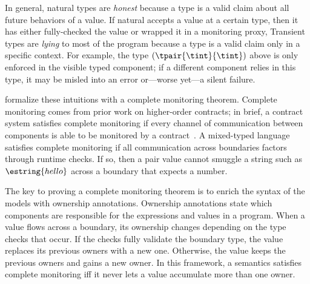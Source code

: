 In general, natural types are \emph{honest}\/ because a type is a valid
 claim about all future behaviors of a value.
If natural accepts a value at a certain type, then it has either fully-checked
 the value or wrapped it in a monitoring proxy,
Transient types are \emph{lying}\/ to most of the program because a type is
 a valid claim only in a specific context.
For example, the type $(\tpair{\tint}{\tint})$ above is only enforced in
 the visible typed component; if a different component relies in this type, it
 may be misled into an error or---worse yet---a silent failure.

\citet{gfd-oopsla-2019} formalize these intuitions with a complete
 monitoring theorem.
Complete monitoring comes from prior work on higher-order contracts;
 in brief, a contract system satisfies complete monitoring if every channel
 of communication between components is able to be monitored
 by a contract~\cite{dtf-esop-2012}.
A mixed-typed language satisfies complete monitoring if all communication
 across boundaries factors through runtime checks.
If so, then a pair value cannot smuggle a string such as $\estring{hello}$
 across a boundary that expects a number.

The key to proving a complete monitoring theorem is to enrich the syntax of
 the models with ownership annotations.
Ownership annotations state which components are responsible for the
 expressions and values in a program.
When a value flows across a boundary, its ownership changes depending on
 the type checks that occur.
If the checks fully validate the boundary type, the value replaces its previous
 owners with a new one.
Otherwise, the value keeps the previous owners and gains a new owner.
In this framework, a semantics satisfies complete monitoring iff it never
 lets a value accumulate more than one owner.





